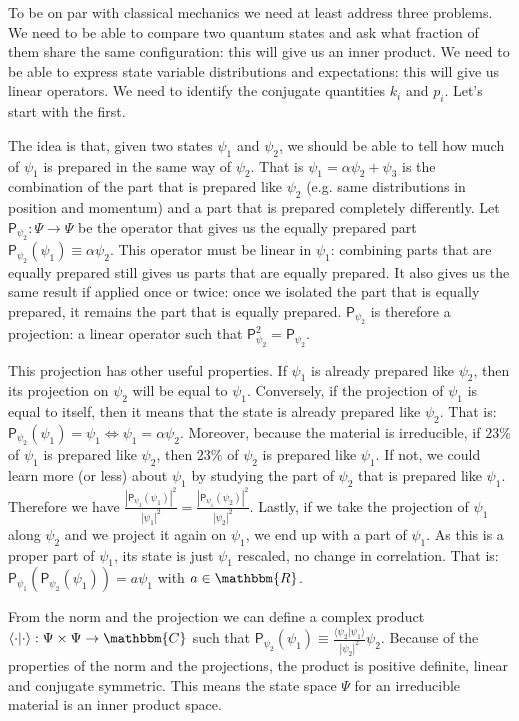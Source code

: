 \documentclass[aps,pra,10pt,twocolumn,floatfix,nofootinbib]{revtex4-1}
\numberwithin{equation}{section}
\theoremstyle{definition}
\begin{document}
To be on par with classical mechanics we need at least address three problems. We need to be able to compare two quantum states and ask what fraction of them share the same configuration: this will give us an inner product. We need to be able to express state variable distributions and expectations: this will give us linear operators. We need to identify the conjugate quantities $k_i$ and $p_i$. Let's start with the first.

The idea is that, given two states $\psi_1$ and $\psi_2$, we should be able to tell how much of $\psi_1$ is prepared in the same way of $\psi_2$. That is $\psi_1 = \alpha \psi_2 + \psi_3$ is the combination of the part that is prepared like $\psi_2$ (e.g. same distributions in position and momentum) and a part that is prepared completely differently. Let $\mathsf{P}_{\psi_2} : \Psi \rightarrow \Psi$ be the operator that gives us the equally prepared part $\mathsf{P}_{\psi_2} (\psi_1) \equiv \alpha \psi_2$. This operator must be linear in $\psi_1$: combining parts that are equally prepared still gives us parts that are equally prepared. It also gives us the same result if applied once or twice: once we isolated the part that is equally prepared, it remains the part that is equally prepared. $\mathsf{P}_{\psi_2}$ is therefore a projection: a linear operator such that $\mathsf{P}^2_{\psi_2}= \mathsf{P}_{\psi_2}$.

This projection has other useful properties. If $\psi_1$ is already prepared like $\psi_2$, then its projection on $\psi_2$ will be equal to $\psi_1$. Conversely, if the projection of $\psi_1$ is equal to itself, then it means that the state is already prepared like $\psi_2$. That is: $\mathsf{P}_{\psi_2} (\psi_1) = \psi_1 \Leftrightarrow \psi_1 = \alpha \psi_2$. Moreover, because the material is irreducible, if $23\%$ of $\psi_1$ is prepared like $\psi_2$, then $23\%$ of $\psi_2$ is prepared like $\psi_1$. If not, we could learn more (or less) about $\psi_1$ by studying the part of $\psi_2$ that is prepared like $\psi_1$. Therefore we have $\frac{|\mathsf{P}_{\psi_2} (\psi_1)|^2}{|\psi_1|^2}=\frac{|\mathsf{P}_{\psi_1} (\psi_2)|^2}{|\psi_2|^2}$. Lastly, if we take the projection of $\psi_1$ along $\psi_2$ and we project it again on $\psi_1$, we end up with a part of $\psi_1$. As this is a proper part of $\psi_1$, its state is just $\psi_1$ rescaled, no change in correlation. That is: $\mathsf{P}_{\psi_1} (\mathsf{P}_{\psi_2} (\psi_1)) = a \psi_1$ with $a \in \mathbbm{R}$.

From the norm and the projection we can define a complex product $\langle \cdot |\cdot \rangle : \Psi \times \Psi \rightarrow \mathbbm{C}$ such that $\mathsf{P}_{\psi_2} (\psi_1) \equiv \frac{\langle \psi_2|\psi_1 \rangle}{|\psi_2|^2} \psi_2$. Because of the properties of the norm and the projections, the product is positive definite, linear and conjugate symmetric. This means the state space $\Psi$ for an irreducible material is an inner product space.
\end{document}
